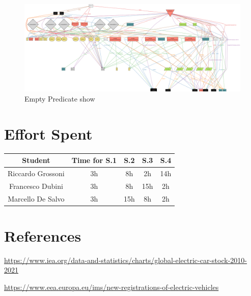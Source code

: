 \documentclass[table, 12pt]{article} %
\begin{document}
    \begin{figure}
        \centering
            \includegraphics[scale=0.35, center]{assets/alloy/run_show_all.png}
            \caption{Empty Predicate show}
            \label{fig: show_full_alloy}
    \end{figure}
    
    \newpage
    \section{Effort Spent}
        \begin{tabular}{| c || c | c| c| c |}
            \hline
            Student & Time for S.1 & S.2 & S.3 & S.4 \\ \hline
            Riccardo Grossoni & 3h & 8h & 2h & 14h \\
            Francesco Dubini & 3h & 8h & 15h & 2h \\
            Marcello De Salvo & 3h & 15h & 8h & 2h \\
            \hline
        \end{tabular}
    \section{References}

    \begin{thebibliography}{9}
        \url{https://www.iea.org/data-and-statistics/charts/global-electric-car-stock-2010-2021}

        \url{https://www.eea.europa.eu/ims/new-registrations-of-electric-vehicles}


    \end{thebibliography}
\end{document}
